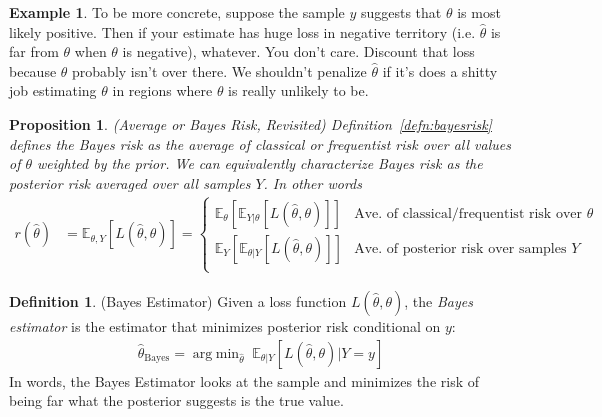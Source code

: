 \documentclass[12pt]{article}
\theoremstyle{plain}
\newtheorem{prop}[thm]{Proposition}
\theoremstyle{definition}
\newtheorem{defn}[thm]{Definition}
\newtheorem{ex}[thm]{Example}
\theoremstyle{remark}
\newcommand{\E}{\mathbb{E}}
\DeclareMathOperator*{\argmin}{arg\;min}
\begin{document}
\begin{ex}
To be more concrete, suppose the sample $y$ suggests that $\theta$ is
most likely positive.  Then if your estimate has huge loss in negative
territory (i.e. $\hat{\theta}$ is far from $\theta$ when $\theta$ is
negative), whatever. You don't care. Discount that loss because $\theta$
probably isn't over there. We shouldn't penalize $\hat{\theta}$ if it's
does a shitty job estimating $\theta$ in regions where $\theta$ is
really unlikely to be.
\end{ex}

\begin{prop}\emph{(Average or Bayes Risk, Revisited)}
\label{prop:bayesrisk}
Definition~\ref{defn:bayesrisk} defines the Bayes risk as the average of
classical or frequentist risk over all values of $\theta$ weighted by
the prior. We can equivalently characterize Bayes risk as the posterior
risk averaged over all samples $Y$. In other words
\begin{align*}
  r(\hat{\theta})
  &= \E_{\theta,Y}[L(\hat{\theta},\theta)]
  =
  \begin{cases}
    \E_\theta\left[\E_{Y|\theta}[L(\hat{\theta},\theta)]\right]
    &\text{Ave.\ of classical/frequentist risk over $\theta$} \\
    \E_Y\left[\E_{\theta|Y}[L(\hat{\theta},\theta)]\right]
    &\text{Ave.\ of posterior risk over samples $Y$} \\
  \end{cases}
\end{align*}
\end{prop}

\begin{defn}(Bayes Estimator)
\label{defn:bayesest}
Given a loss function $L(\hat{\theta},\theta)$, the
\emph{Bayes estimator} is the estimator that minimizes posterior risk
conditional on $y$:
\begin{align*}
  \hat{\theta}_{\text{Bayes}}
  = \argmin_{\hat{\theta}} \;
  \E_{\theta|Y}[L(\hat{\theta},\theta)|Y=y]
\end{align*}
In words, the Bayes Estimator looks at the sample and minimizes the risk
of being far what the posterior suggests is the true value.
\end{defn}
\end{document}
